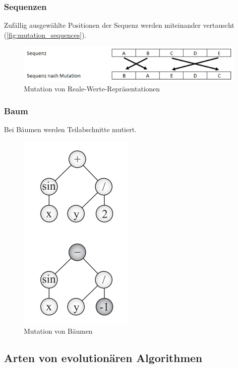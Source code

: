       \subsubsection{Sequenzen}

        Zufällig ausgewählte Positionen der Sequenz werden miteinander vertauscht (\vref{fig:mutation_sequences}).

        \begin{figure}[H]
            \includegraphics[scale=1, center]{graphics/mutation_sequences}
            \caption{Mutation von Reale-Werte-Repräsentationen\label{fig:mutation_sequences}}
        \end{figure}

      \subsubsection{Baum}

        Bei Bäumen werden Teilabschnitte mutiert.
        \begin{figure}[H]
            \includegraphics[scale=0.8, center]{graphics/mutation_tree}
            \caption{Mutation von Bäumen~\cite[S.29]{book:bioInspired}\label{fig:mutation_tree}}
        \end{figure}


  \subsection{Arten von evolutionären Algorithmen\label{sub:artenEvAlgos}}

